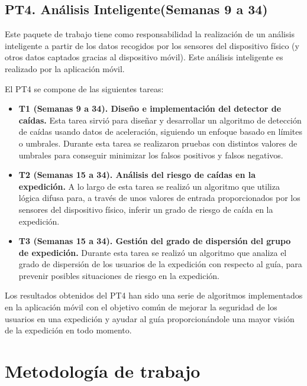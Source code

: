 \subsection{\ac{PT}4. Análisis Inteligente(Semanas 9 a 34)}

Este paquete de trabajo tiene como responsabilidad la realización de un análisis inteligente a partir de los datos recogidos por los sensores del dispositivo físico (y otros datos captados gracias al dispositivo móvil). Este análisis inteligente es realizado por la aplicación móvil.

El \ac{PT}4 se compone de las siguientes tareas:

\begin{itemize}
\item \textbf{\ac{T}1 (Semanas 9 a 34). Diseño e implementación del detector de caídas.} Esta tarea sirvió para diseñar y desarrollar un algoritmo de detección de caídas usando datos de aceleración, siguiendo un enfoque basado en límites o umbrales. Durante esta tarea se realizaron pruebas con distintos valores de umbrales para conseguir minimizar los falsos positivos y falsos negativos. 
\item \textbf{\ac{T}2 (Semanas 15 a 34). Análisis del riesgo de caídas en la expedición.} A lo largo de esta tarea se realizó un algoritmo que utiliza lógica difusa para, a través de unos valores de entrada proporcionados por los sensores del dispositivo físico, inferir un grado de riesgo de caída en la expedición.
\item \textbf{\ac{T}3 (Semanas 15 a 34). Gestión del grado de dispersión del grupo de expedición.} Durante esta tarea se realizó un algoritmo que analiza el grado de dispersión de los usuarios de la expedición con respecto al guía, para prevenir posibles situaciones de riesgo en la expedición.
\end{itemize}

Los resultados obtenidos del \ac{PT}4 han sido una serie de algoritmos implementados en la aplicación móvil con el objetivo común de mejorar la seguridad de los usuarios en una expedición y ayudar al guía proporcionándole una mayor visión de la expedición en todo momento.

\section{Metodología de trabajo}

